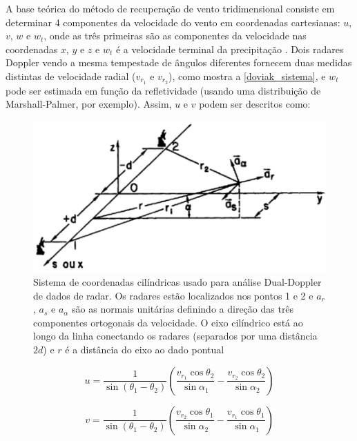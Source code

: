 A base teórica do método de recuperação de vento tridimensional consiste em determinar 4 componentes da velocidade do vento em coordenadas cartesianas: $u$, $v$, $w$ e $w_t$, onde as três primeiras são as componentes da velocidade nas coordenadas $x$, $y$ e $z$ e $w_t$ é a velocidade terminal da precipitação \cite{Rinehart1997}. Dois radares Doppler vendo a mesma tempestade de ângulos diferentes fornecem duas medidas distintas de velocidade radial ($v_{r_1}$ e $v_{r_2}$), como mostra a \autoref{doviak_sistema}, e $w_t$ pode ser estimada em função da refletividade (usando uma distribuição de Marshall-Palmer, por exemplo). Assim, $u$ e $v$ podem ser descritos como:

\begin{figure}[htb]
	\begin{center}
		\caption{Sistema de coordenadas cilíndricas usado para análise Dual-Doppler de dados de radar. Os radares estão localizados nos pontos 1 e 2 e $a_r$, $a_s$ e $a_\alpha$ são as normais unitárias definindo a direção das três componentes ortogonais da velocidade. O eixo cilíndrico está ao longo da linha conectando os radares (separados por uma distância $2d$) e $r$ é a distância do eixo ao dado pontual} 
		\label{doviak_sistema}
		\includegraphics[width=0.8\columnwidth]{figs/system_doviak_ptbr.png}
	\end{center}
\end{figure}

\begin{equation}
u=\frac{1}{\sin{(\theta_1 - \theta_2)}}\left(\frac{v_{r_1}\cos{\theta_2}}{\sin{\alpha_1}}-\frac{v_{r_2}\cos{\theta_2}}{\sin{\alpha_2}}\right)
\end{equation}

\begin{equation}
v=\frac{1}{\sin{(\theta_1 - \theta_2)}}\left(\frac{v_{r_2}\cos{\theta_1}}{\sin{\alpha_2}}-\frac{v_{r_1}\cos{\theta_1}}{\sin{\alpha_1}}\right)
\end{equation}

